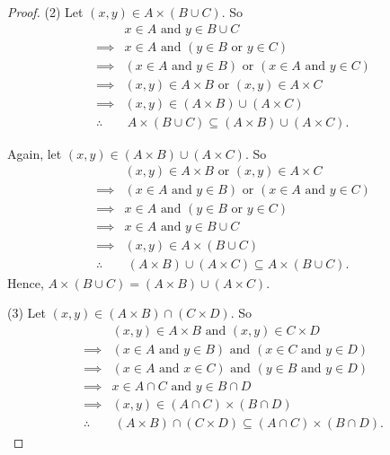 \documentclass[12pt]{article}
\newcommand{\ro}{\text { or }}
\newcommand{\nd}{\text{ and }}
\begin{document}
\begin{proof}
	(2) Let $(x,y)\in A\times (B \cup C)$. So
	\begin{align*}
		           & x\in A \nd y\in B\cup C                                    \\
		\implies   & x\in A \nd (y\in B \ro y\in C)                             \\
		\implies   & (x\in A \nd y\in B) \ro (x\in A \nd y\in C )               \\
		\implies   & (x,y)\in A\times B \ro (x,y)\in A\times C                  \\
		\implies   & (x,y)\in (A\times B)\cup (A\times C)                       \\
		\therefore & \ A\times (B\cup C) \subseteq (A\times B)\cup (A\times C).
	\end{align*}

	Again, let $(x,y)\in (A\times B)\cup (A\times C)$. So
	\begin{align*}
		           & (x,y)\in A\times B \ro (x,y)\in A\times C                   \\
		\implies   & (x\in A \nd y\in B) \ro (x\in A \nd y\in C)                 \\
		\implies   & x\in A \nd (y\in B \ro y\in C)                              \\
		\implies   & x\in A \nd y\in B\cup C                                     \\
		\implies   & (x,y)\in A\times (B\cup C)                                  \\
		\therefore & \ (A\times B)\cup (A\times C)  \subseteq A\times (B\cup C).
	\end{align*}
	Hence, $A\times (B\cup C) = (A\times B)\cup (A\times C)$.

	(3) Let $(x, y) \in (A \times B) \cap (C \times D)$. So
	\begin{align*}
		           & (x, y) \in A \times B \nd (x, y) \in C \times D                          \\
		\implies   & (x \in A \nd y \in B) \nd (x \in C \nd y \in D)                          \\
		\implies   & (x\in A \nd x\in C) \nd (y\in B \nd y\in D)                              \\
		\implies   & x \in A \cap C \nd y \in B \cap D                                        \\
		\implies   & (x, y) \in (A \cap C) \times (B \cap D)                                  \\
		\therefore & \ (A \times B) \cap (C \times D) \subseteq (A \cap C) \times (B \cap D).
	\end{align*}


\end{proof}
\end{document}

